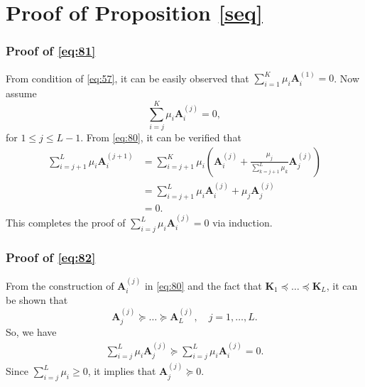 \documentclass[journal,final, onecolumn]{IEEEtran}
\begin{document}
\section{Proof of Proposition \ref{seq}}\label{proof_seq}
\subsubsection{Proof of \eqref{eq:81}}
From condition of \eqref{eq:57}, it can be easily observed that $\sum_{i=1}^{K} \mu_i \boldsymbol{A}^{(1)}_{i} = 0$. Now assume
\begin{equation}
\sum_{i=j}^{K} \mu_i \boldsymbol{A}^{(j)}_{i} = 0,
\end{equation}
for $1\leq j \leq L-1$. From \eqref{eq:80}, it can be verified that
\begin{align}
\sum_{i=j+1}^{L} \mu_i \boldsymbol{A}^{(j+1)}_{i} &= \sum_{i=j+1}^{K} \mu_{i} \left(  \boldsymbol{A}^{(j)}_{i} + \frac{\mu_{j}}{\sum_{k=j+1}^{L} \mu_{k}} \boldsymbol{A}^{(j)}_{j}\right) \\
&= \sum_{i=j+1}^{L} \mu_{i}\boldsymbol{A}^{(j)}_{i} + \mu_{j} \boldsymbol{A}^{(j)}_{j}\\
&=0.
\end{align}
This completes the proof of $\sum_{i=j}^{L} \mu_i \boldsymbol{A}^{(j)}_{i} = 0$ via induction.
\subsubsection{Proof of \eqref{eq:82}} From the construction of $\boldsymbol{A}^{(j)}_{i}$ in \eqref{eq:80} and the fact that $\boldsymbol{K}_{1} \preceq \ldots \preceq \boldsymbol{K}_{L}$, it can be shown that
\begin{equation}
\boldsymbol{A}^{(j)}_{j}\succeq\ldots \succeq \boldsymbol{A}^{(j)}_{L}, \quad j=1,\ldots,L.
\end{equation}
So, we have
\begin{align}
\sum_{i=j}^{L} \mu_i \boldsymbol{A}^{(j)}_{j} \succeq \sum_{i=j}^{L} \mu_i \boldsymbol{A}^{(j)}_{i}=0.
\end{align}
Since $\sum_{i=j}^{L} \mu_i \geq 0$, it implies that $\boldsymbol{A}^{(j)}_{j} \succeq 0$.
\smallskip



















\end{document}
